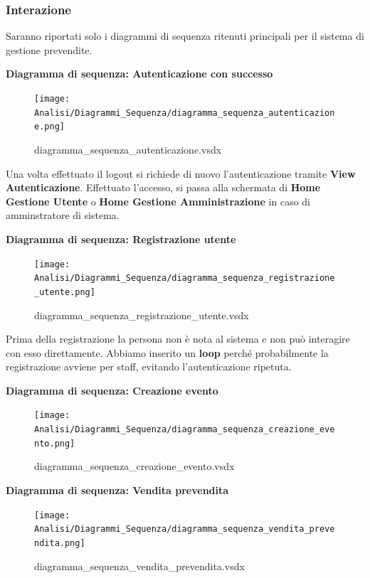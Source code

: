 \documentclass[a4paper]{article}
\begin{document}
\newpage

\subsubsection{Interazione}

Saranno riportati solo i diagrammi di sequenza ritenuti principali per il sistema di gestione prevendite.

\textbf{Diagramma di sequenza: Autenticazione con successo}

\begin{figure}[H]
    \texttt{[image: Analisi/Diagrammi\_Sequenza/diagramma\_sequenza\_autenticazione.png]}
    \centering
    \caption{diagramma\_sequenza\_autenticazione.vsdx}
\end{figure}

Una volta effettuato il logout si richiede di nuovo l'autenticazione tramite \textbf{View Autenticazione}. Effettuato l'accesso, si passa alla schermata di \textbf{Home Gestione Utente} o \textbf{Home Gestione Amministrazione} in caso di amminstratore di sistema. 

\textbf{Diagramma di sequenza: Registrazione utente}

\begin{figure}[H]
    \texttt{[image: Analisi/Diagrammi\_Sequenza/diagramma\_sequenza\_registrazione\_utente.png]}
    \centering
    \caption{diagramma\_sequenza\_registrazione\_utente.vsdx}
\end{figure}

Prima della registrazione la persona non è nota al sistema e non può interagire con esso direttamente. Abbiamo inserito un \textbf{loop} perché probabilmente la registrazione avviene per staff, evitando l'autenticazione ripetuta.

\newpage

\textbf{Diagramma di sequenza: Creazione evento}

\begin{figure}[H]
    \texttt{[image: Analisi/Diagrammi\_Sequenza/diagramma\_sequenza\_creazione\_evento.png]}
    \centering
    \caption{diagramma\_sequenza\_creazione\_evento.vsdx}
\end{figure}

\textbf{Diagramma di sequenza: Vendita prevendita}

\begin{figure}[H]
    \texttt{[image: Analisi/Diagrammi\_Sequenza/diagramma\_sequenza\_vendita\_prevendita.png]}
    \centering
    \caption{diagramma\_sequenza\_vendita\_prevendita.vsdx}
\end{figure}
\end{document}
